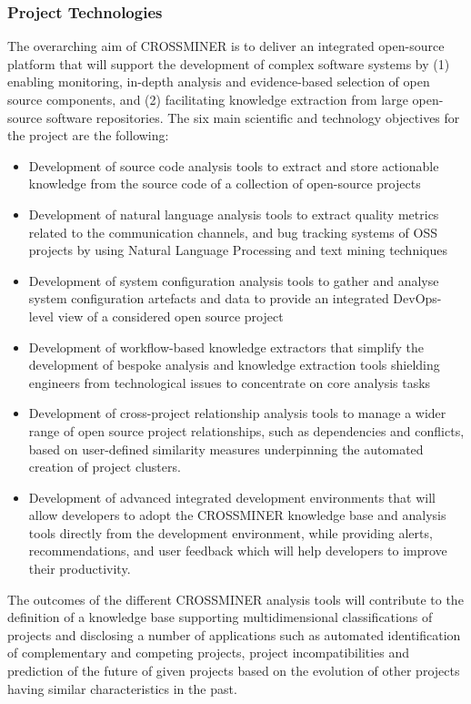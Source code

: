\subsubsection{Project Technologies}
The overarching aim of CROSSMINER is to deliver an integrated open-source platform that will support the development of complex software systems by (1) enabling monitoring, in-depth analysis and evidence-based selection of open source components, and (2) facilitating knowledge extraction from large open-source software repositories. The six main scientific and technology objectives for the project are the following:
\begin{itemize}
\item Development of source code analysis tools to extract and store actionable knowledge from the source code of a collection of open-source projects

\item Development of natural language analysis tools to extract quality metrics related to the communication channels, and bug tracking systems of OSS projects by using Natural Language Processing and text mining techniques

\item Development of system configuration analysis tools to gather and analyse system configuration artefacts and data to provide an integrated DevOps-level view of a considered open source project

\item Development of workflow-based knowledge extractors that simplify the development of bespoke analysis and knowledge extraction tools shielding engineers from technological issues to concentrate on core analysis tasks

\item Development of cross-project relationship analysis tools to manage a wider range of open source project relationships, such as dependencies and conflicts, based on user-defined similarity measures underpinning the automated creation of project clusters.

\item Development of advanced integrated development environments that will allow developers to adopt the CROSSMINER knowledge base and analysis tools directly from the development environment, while providing alerts, recommendations, and user feedback which will help developers to improve their productivity.
\end{itemize}
The outcomes of the different CROSSMINER analysis tools will contribute to the definition of a knowledge base supporting multidimensional classifications of projects and disclosing a number of applications such as automated identification of complementary and competing projects, project incompatibilities and prediction of the future of given projects based on the evolution of other projects having similar characteristics in the past.
